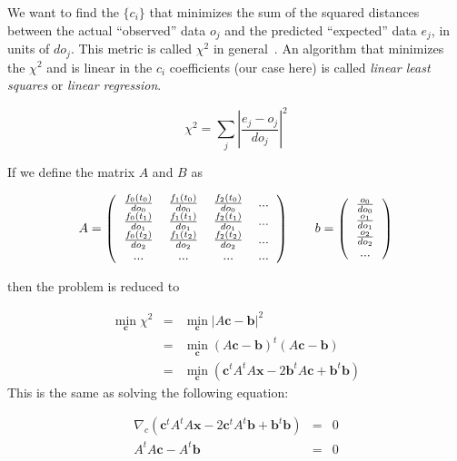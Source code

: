 \documentclass[justified, sixbynine]{tufte-book}
\theoremstyle{plain}%
\newtheorem * {corollary}{Corollary}
\theoremstyle{definition}
\theoremstyle{remark}
\newtheorem * {remark}{Remark}
\newtheorem * {note}{Note}
\begin{document}
\begin{fullwidth}
We want to find the $\{c_i\}$ that minimizes the sum of the squared distances between the actual ``observed'' data $o_j$ and the predicted ``expected'' data $e_j$, in units of $do_j$. This metric is called $\chi^2$ in general~\cite{chi2}. An algorithm that minimizes the $\chi^2$  and is linear in the $c_i$ coefficients (our case here) is called {\it linear least squares} or {\it linear regression}.

\begin{equation}
\chi^2 = \sum_j \left|\frac{e_j - o_j}{do_j}\right|^2
\end{equation}

If we define the matrix $A$ and $B$ as

\begin{equation}
A=\left(
\begin{tabular}{cccc}
$\frac{f_0(t_0)}{do_0}$ & $\frac{f_1(t_0)}{do_0}$ & $\frac{f_2(t_0)}{do_0}$ &...\\
$\frac{f_0(t_1)}{do_1}$ & $\frac{f_1(t_1)}{do_1}$ & $\frac{f_2(t_1)}{do_1}$ &...\\
$\frac{f_0(t_2)}{do_2}$ & $\frac{f_1(t_2)}{do_2}$ & $\frac{f_2(t_2)}{do_2}$ &...\\
...& ...& ... & ...
\end{tabular}
\right) \qquad b =
\left(
\begin{tabular}{c}
$\frac{o_0}{do_0}$ \\
$\frac{o_1}{do_1}$ \\
$\frac{o_2}{do_2}$ \\
...
\end{tabular}
\right)
\end{equation}

then the problem is reduced to

\begin{eqnarray}
\min_{\mathbf{c}}\chi^2 &=& \min_{\mathbf{c}} |A\mathbf{c}-\mathbf{b}|^2 \\
  &=& \min_{\mathbf{c}} (A\mathbf{c}-\mathbf{b})^t (A\mathbf{c}-\mathbf{b}) \\
  &=& \min_{\mathbf{c}} (\mathbf{c}^t A^t A \mathbf x - 2\mathbf{b}^t A \mathbf{c} + \mathbf{b}^t \mathbf{b})
\end{eqnarray}
This is the same as solving the following equation:

\begin{eqnarray}
\nabla_{c} (\mathbf{c}^t A^t A \mathbf x - 2\mathbf{c}^t A^t \mathbf{b} + \mathbf{b}^t\mathbf{b}) &=& 0 \\
A^t A \mathbf{c} - A^t \mathbf{b} &=& 0
\end{eqnarray}


\end{fullwidth}
\end{document}
